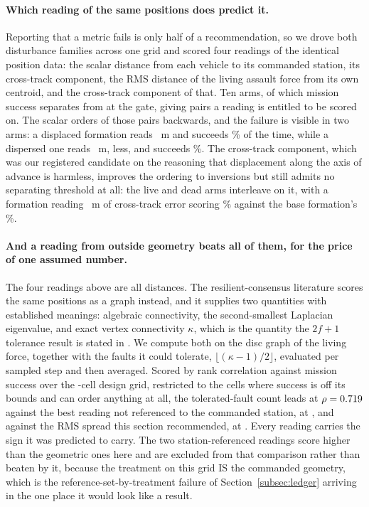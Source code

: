 \documentclass[11pt]{article}
\begin{document}
\paragraph{Which reading of the same positions does predict it.} Reporting that a metric fails is
only half of a recommendation, so we drove both disturbance families across one grid and scored four
readings of the identical position data: the scalar distance from each vehicle to its commanded
station, its cross-track component, the RMS distance of the living assault force from its own
centroid, and the cross-track component of that. Ten arms, of which mission success separates
\DsLive{} from \DsDead{} at the gate, giving \DsPairs{} pairs a reading is entitled to be scored on.
The scalar orders \DsScalarInv{} of those \DsPairs{} pairs backwards, and the failure is visible in
two arms: a displaced formation reads \DsOutSc{}~m and succeeds \DsOutSuc\% of the time, while a
dispersed one reads \DsSpSc{}~m, less, and succeeds \DsSpSuc\%. The cross-track component, which was
our registered candidate on the reasoning that displacement along the axis of advance is harmless,
improves the ordering to \DsCrossInv{} inversions but still admits no separating threshold at all:
the live and dead arms interleave on it, with a formation reading \DsMidCross{}~m of cross-track
error scoring \DsMidSuc\% against the base formation's \DsBaseSuc\%.

\paragraph{And a reading from outside geometry beats all of them, for the price of one assumed number.} The four readings above are all distances. The resilient-consensus literature scores the same positions as a graph instead, and it supplies two quantities with established meanings: algebraic connectivity, the second-smallest Laplacian eigenvalue, and exact vertex connectivity $\kappa$, which is the quantity the $2f+1$ tolerance result is stated in \citep{sundaram2011distributed,leblanc2013resilient}. We compute both on the disc graph of the living force, together with the faults it could tolerate, $\lfloor(\kappa-1)/2\rfloor$, evaluated per sampled step and then averaged. Scored by rank correlation against mission success over the \GrCells{}-cell design grid, restricted to the \GrCellsUsed{} cells where success is off its bounds and can order anything at all, the tolerated-fault count leads at $\rho = 0.719{}$ against the best reading not referenced to the commanded station, \GrGeoBest{} at \GrGeoBestRho{}, and against the RMS spread this section recommended, at \GrWorstRho{}. Every reading carries the sign it was predicted to carry. The two station-referenced readings score higher than the geometric ones here and are excluded from that comparison rather than beaten by it, because the treatment on this grid IS the commanded geometry, which is the reference-set-by-treatment failure of Section~\ref{subsec:ledger} arriving in the one place it would look like a result.
\end{document}
